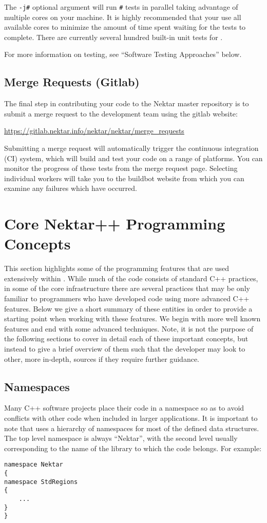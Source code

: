 The \lstinline{-j#} optional argument will run \lstinline{#} tests in parallel
taking advantage of multiple cores on your machine.  It is highly
recommended that your use all available cores to minimize the amount
of time spent waiting for the tests to complete. There are currently
several hundred built-in unit tests for {\nek}.

For more information on testing, see ``Software Testing Approaches'' below.

\subsection{Merge Requests (Gitlab)}
The final step in contributing your code to the
Nektar master repository is to submit a merge request to the
development team using the {\nek} gitlab website:
  
\url{https://gitlab.nektar.info/nektar/nektar/merge\_requests}
  
Submitting a merge request will automatically trigger the continuous integration (CI) system, which will build and test your code on a range of platforms. You can monitor the progress of these tests from the merge request page. Selecting individual workers will take you to the buildbot website from which you can examine any failures which have occurred.
  



\section{Core Nektar++ Programming Concepts}
\lstset{style=C++Style}

This section highlights some of the programming features that are used
extensively within {\nek}. While much of the code consists of
standard C++ practices, in some of the core infrastructure there are
several practices that may be only familiar to programmers who have
developed code using more advanced C++ features.  Below we give a
short summary of these entities in order to provide a starting point
when working with these features. We begin with more well known
features and end with some advanced techniques.  Note, it is not the
purpose of the following sections to cover in detail each of these
important concepts, but instead to give a brief overview of them such that the developer may look to other, more in-depth, sources if
they require further guidance.

\subsection{Namespaces}
Many C++ software projects place their code in a namespace so as to avoid conflicts with other code when included in larger applications.  It is important to note that {\nek} uses a hierarchy of namespaces for most of the defined data structures.  The top level namespace is always ``Nektar'', with the second level usually corresponding to the name of the library to which the code belongs. For example:
\begin{lstlisting}
namespace Nektar
{
namespace StdRegions
{
    ...
}
}
\end{lstlisting}

